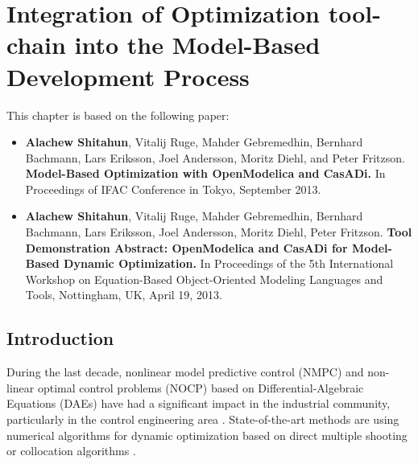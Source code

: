 

\chapter{Integration of Optimization tool-chain into the Model-Based Development Process}
\label{cha:optimization}

This chapter is based on the following paper:

\begin{itemize}
	
	\item \textbf{Alachew Shitahun}, Vitalij Ruge, Mahder Gebremedhin, Bernhard Bachmann, Lars Eriksson, Joel Andersson, Moritz Diehl, and Peter Fritzson. \textbf{Model-Based Optimization with OpenModelica and CasADi.} In Proceedings of IFAC Conference in Tokyo, September 2013. 
	
	\item  \textbf{Alachew Shitahun}, Vitalij Ruge, Mahder Gebremedhin, Bernhard Bachmann, Lars Eriksson, Joel Andersson, Moritz Diehl, Peter Fritzson. \textbf{Tool Demonstration Abstract: OpenModelica and CasADi for Model-Based Dynamic Optimization.} In Proceedings of the 5th International Workshop on Equation-Based Object-Oriented Modeling Languages and Tools, Nottingham, UK, April 19, 2013. 
		
\end{itemize}



\section{Introduction}
\label{sec:optimizationintroduction}

During the last decade, nonlinear model predictive control (NMPC) and non-linear optimal control problems (NOCP)
based on Differential-Algebraic Equations (DAEs) have had a significant impact in the industrial community, particularly in
the control engineering area \cite{biegler, tamimi}. State-of-the-art methods are using numerical
algorithms for dynamic optimization based on direct multiple shooting \cite{bock} or collocation algorithms
\cite{biegler}.

